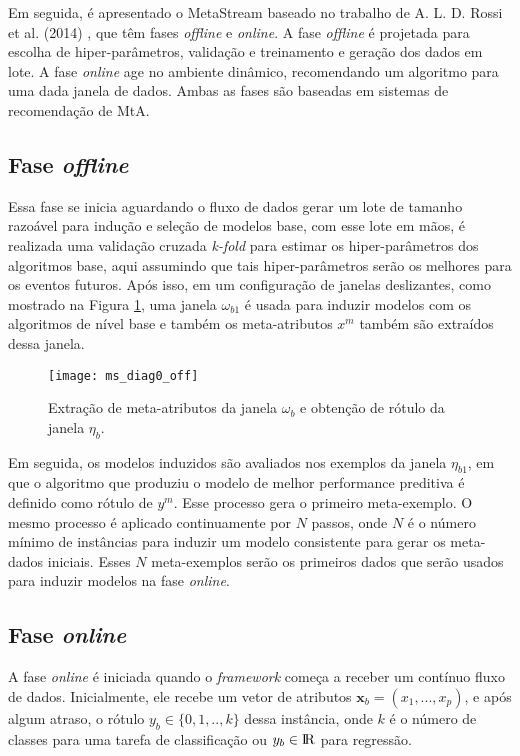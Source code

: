 Em seguida, é apresentado o MetaStream baseado no trabalho de A. L. D. Rossi et
al. (2014) \cite{rossi2014metastream}, que têm fases \textit{offline} e \textit{online}.
A fase \textit{offline} é projetada para escolha de hiper-parâmetros, validação e
treinamento e geração dos dados em lote. A fase \textit{online} age no ambiente dinâmico, recomendando um algoritmo para uma dada janela de dados. Ambas as fases são baseadas em sistemas de recomendação de MtA.


\subsection{Fase \textit{offline}}
\label{subsec:offline}
Essa fase se inicia aguardando o fluxo de dados gerar um lote de tamanho
razoável para indução e seleção de modelos base, com esse lote em mãos, é
realizada uma validação cruzada \textit{k-fold} para estimar os
hiper-parâmetros dos algoritmos base, aqui assumindo que tais hiper-parâmetros
serão os melhores para os eventos futuros.
Após isso, em um configuração de janelas deslizantes, como mostrado na Figura
\ref{fig:ms_diag0_off}, uma janela $\omega_{b1}$ é usada para induzir modelos
com os algoritmos de nível base e também os meta-atributos $x^m$ também são
extraídos dessa janela.

\begin{figure}[ht]
    \centering
    \texttt{[image: ms\_diag0\_off]}
    \caption{Extração de meta-atributos da janela $\omega_b$ e obtenção de
    rótulo da janela $\eta_b$.}
    \label{fig:ms_diag0_off}
\end{figure}

Em seguida, os modelos induzidos são avaliados nos exemplos da janela
$\eta_{b1}$, em que o algoritmo que produziu o modelo de melhor performance
preditiva é definido como rótulo de $y^m$. Esse processo gera o primeiro
meta-exemplo. O mesmo processo é aplicado continuamente por $N$ passos, onde
$N$ é o número mínimo de instâncias para induzir um modelo consistente para
gerar os meta-dados iniciais. Esses $N$ meta-exemplos serão os primeiros dados
que serão usados para induzir modelos na fase \textit{online}.

\subsection{Fase \textit{online}}
\label{subsec:online}

A fase \textit{online} é iniciada quando o \textit{framework} começa a receber um contínuo fluxo de dados.
Inicialmente, ele recebe um vetor de atributos $\boldsymbol{x}_b =
(x_1,...,x_p)$, e após algum atraso, o rótulo $y_b \in \{0,1,..,k\}$
dessa instância, onde $k$ é o número de classes para uma tarefa de classificação ou $y_b \in \rm{I\!R}$ para
regressão.

